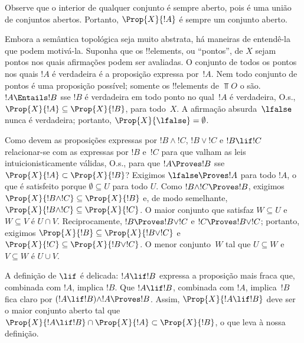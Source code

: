 \documentclass[../../../include/open-logic-section]{subfiles}
\begin{document}
Observe que o interior de qualquer conjunto é sempre aberto, pois é
uma união de conjuntos abertos. Portanto, $\Prop{X}{!A}$ é sempre um
conjunto aberto.

Embora a semântica topológica seja muito abstrata, há maneiras de
entendê-la que podem motivá-la. Suponha que os !!{element}s, ou
``pontos'', de $X$ sejam pontos nos quais afirmações podem ser
avaliadas. O conjunto de todos os pontos nos quais $!A$ é verdadeira é
a proposição expressa por~$!A$. Nem todo conjunto de pontos é uma
proposição possível; somente os !!{element}s de $\Top{O}$ o são.
$!A \Entails !B$ sse $!B$ é verdadeira em todo ponto no qual~$!A$ é
verdadeira, O.s.\@, $\Prop{X}{!A} \subseteq \Prop{X}{!B}$, para
todo~$X$. A afirmação absurda~$\lfalse$ nunca é verdadeira; portanto,
$\Prop{X}{\lfalse} = \emptyset$.

Como devem as proposições expressas por $!B \land !C$, $!B \lor !C$
e $!B \lif !C$ relacionar-se com as expressas por $!B$ e~$!C$ para que
valham as leis intuicionisticamente válidas, O.s.\@, para que
$!A \Proves !B$ sse $\Prop{X}{!A} \subset \Prop{X}{!B}$? Exigimos
$\lfalse \Proves !A$ para todo $!A$, o que é satisfeito porque
$\emptyset \subseteq U$ para todo $U$. Como $!B \land !C \Proves !B$,
exigimos $\Prop{X}{!B \land !C} \subseteq \Prop{X}{!B}$ e, de modo
semelhante, $\Prop{X}{!B \land !C} \subseteq \Prop{X}{!C}$. O maior
conjunto que satisfaz $W \subseteq U$ e $W \subseteq V$ é $U \cap V$.
Reciprocamente, $!B \Proves !B \lor !C$ e $!C \Proves !B \lor !C$;
portanto, exigimos $\Prop{X}{!B} \subseteq \Prop{X}{!B \lor !C}$ e
$\Prop{X}{!C} \subseteq \Prop{X}{!B \lor !C}$. O menor conjunto~$W$
tal que $U \subseteq W$ e $V \subseteq W$ é $U \cup V$.

A definição de $\lif$ é delicada: $!A \lif !B$ expressa a proposição
mais fraca que, combinada com $!A$, implica $!B$. Que $!A \lif !B$,
combinada com $!A$, implica~$!B$ fica claro por
$(!A \lif !B) \land !A \Proves !B $. Assim, $\Prop{X}{!A \lif !B}$
deve ser o maior conjunto aberto tal que
$\Prop{X}{!A \lif !B} \cap \Prop{X}{!A} \subset \Prop{X}{!B}$, o que
leva à nossa definição.
\end{document}
